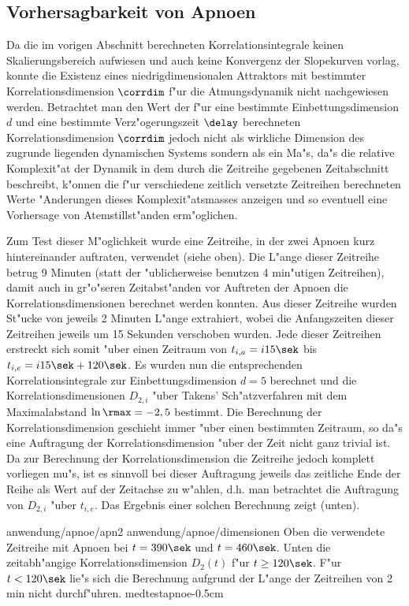 \subsection{Vorhersagbarkeit von Apnoen}
Da die im vorigen Abschnitt berechneten Korrelationsintegrale keinen Skalierungsbereich
aufwiesen und auch keine Konvergenz der Slopekurven vorlag, konnte die Existenz eines
niedrigdimensionalen Attraktors mit bestimmter Korrelationsdimension $\corrdim$ f"ur die
Atmungsdynamik nicht nachgewiesen werden. Betrachtet man den Wert der f"ur eine bestimmte
Einbettungsdimension $d$ und eine bestimmte Verz"ogerungszeit $\delay$ berechneten
Korrelationsdimension $\corrdim$ jedoch nicht als wirkliche Dimension des zugrunde
liegenden dynamischen Systems sondern als ein Ma"s, da"s die relative Komplexit"at der
Dynamik in dem durch die Zeitreihe gegebenen Zeitabschnitt beschreibt, k"onnen die f"ur
verschiedene zeitlich versetzte Zeitreihen berechneten Werte "Anderungen dieses
Komplexit"atsmasses anzeigen und so eventuell eine Vorhersage von Atemstillst"anden
erm"oglichen.

Zum Test dieser M"oglichkeit wurde eine Zeitreihe, in der zwei Apnoen kurz
hintereinander auftraten,
verwendet (siehe  oben). Die L"ange dieser Zeitreihe betrug 9 Minuten
(statt der "ublicherweise benutzen 4 min"utigen Zeitreihen), damit auch in  gr"o"seren
Zeitabst"anden vor Auftreten der Apnoen die Korrelationsdimensionen berechnet werden
konnten. Aus dieser Zeitreihe wurden St"ucke von jeweils 2 Minuten L"ange
extrahiert, wobei die Anfangszeiten dieser Zeitreihen jeweils um 15 Sekunden verschoben
wurden. Jede dieser Zeitreihen erstreckt sich somit "uber einen Zeitraum von $t_{i,a}=i
15\sek$ bis $t_{i,e}=i 15\sek + 120\sek$. Es wurden nun die
entsprechenden Korrelationsintegrale zur Einbettungsdimension $d=5$ berechnet und die Korrelationsdimensionen $D_{2,i}$ "uber Takens' 
Sch"atzverfahren mit dem Maximalabstand $\ln\rmax=-2,5$
bestimmt. Die Berechnung der Korrelationsdimension geschieht immer "uber einen bestimmten
Zeitraum, so da"s eine Auftragung der Korrelationsdimension "uber der Zeit nicht ganz
trivial ist.
Da zur Berechnung der Korrelationsdimension die Zeitreihe jedoch komplett vorliegen
mu"s, ist es sinnvoll bei dieser Auftragung jeweils das zeitliche Ende der Reihe als Wert auf
der Zeitachse zu w"ahlen, d.h. man betrachtet die Auftragung von $D_{2,i}$ "uber
$t_{i,e}$. Das Ergebnis einer solchen Berechnung zeigt  (unten).

\epsfigdouble
{anwendung/apnoe/apn2}
{anwendung/apnoe/dimensionen}
{
Oben die verwendete Zeitreihe mit Apnoen bei $t=390\sek$ und $t=460\sek$. Unten die
zeitabh"angige Korrelationsdimension $D_2(t)$ f"ur $t\geq 120\sek$. F"ur $t<120\sek$ lie"s 
sich die Berechnung aufgrund der L"ange der Zeitreihen von 2 min nicht durchf"uhren.
}
{medtestapnoe}{-0.5cm}

